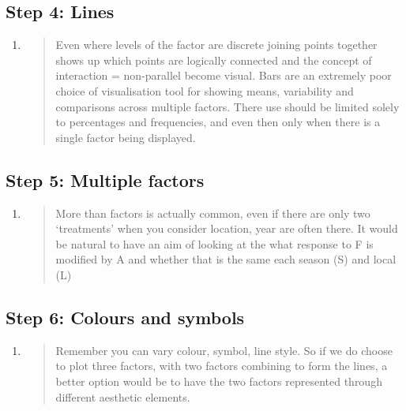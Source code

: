 \documentclass[
]{book}
\begin{document}
\hypertarget{step-4-lines}{%
\subsection{Step 4: Lines}\label{step-4-lines}}

\begin{enumerate}
\def\labelenumi{\alph{enumi}.}
\item
  \begin{quote}
  Even where levels of the factor are discrete joining points together shows up which points are logically connected and the concept of interaction = non-parallel become visual. Bars are an extremely poor choice of visualisation tool for showing means, variability and comparisons across multiple factors. There use should be limited solely to percentages and frequencies, and even then only when there is a single factor being displayed.
  \end{quote}
\end{enumerate}

\hypertarget{step-5-multiple-factors}{%
\subsection{Step 5: Multiple factors}\label{step-5-multiple-factors}}

\begin{enumerate}
\def\labelenumi{\alph{enumi}.}
\item
  \begin{quote}
  More than factors is actually common, even if there are only two `treatments' when you consider location, year are often there. It would be natural to have an aim of looking at the what response to F is modified by A and whether that is the same each season (S) and local (L)
  \end{quote}
\end{enumerate}

\hypertarget{step-6-colours-and-symbols}{%
\subsection{Step 6: Colours and symbols}\label{step-6-colours-and-symbols}}

\begin{enumerate}
\def\labelenumi{\alph{enumi}.}
\item
  \begin{quote}
  Remember you can vary colour, symbol, line style. So if we do choose to plot three factors, with two factors combining to form the lines, a better option would be to have the two factors represented through different aesthetic elements.
  \end{quote}
\end{enumerate}
\end{document}
